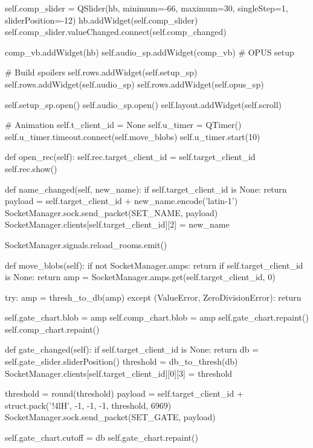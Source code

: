 \begin{pythoncode}
        self.comp_slider = QSlider(hb, minimum=-66, maximum=30, singleStep=1, sliderPosition=-12)
        hb.addWidget(self.comp_slider)
        self.comp_slider.valueChanged.connect(self.comp_changed)

        comp_vb.addWidget(hb)
        self.audio_sp.addWidget(comp_vb)
        # OPUS setup

        # Build spoilers
        self.rows.addWidget(self.setup_sp)
        self.rows.addWidget(self.audio_sp)
        self.rows.addWidget(self.opus_sp)

        self.setup_sp.open()
        self.audio_sp.open()
        self.layout.addWidget(self.scroll)

        # Animation
        self.t_client_id = None
        self.u_timer = QTimer()
        self.u_timer.timeout.connect(self.move_blobs)
        self.u_timer.start(10)

    def open_rec(self):
        self.rec.target_client_id = self.target_client_id
        self.rec.show()

    def name_changed(self, new_name):
        if self.target_client_id is None:
            return
        payload = self.target_client_id + new_name.encode('latin-1')
        SocketManager.sock.send_packet(SET_NAME, payload)
        SocketManager.clients[self.target_client_id][2] = new_name

        SocketManager.signals.reload_rooms.emit()

    def move_blobs(self):
        if not SocketManager.amps:
            return
        if self.target_client_id is None:
            return
        amp = SocketManager.amps.get(self.target_client_id, 0)

        try:
            amp = thresh_to_db(amp)
        except (ValueError, ZeroDivisionError):
            return

        self.gate_chart.blob = amp
        self.comp_chart.blob = amp
        self.gate_chart.repaint()
        self.comp_chart.repaint()

    def gate_changed(self):
        if self.target_client_id is None:
            return
        db = self.gate_slider.sliderPosition()
        threshold = db_to_thresh(db)
        SocketManager.clients[self.target_client_id][0][3] = threshold

        threshold = round(threshold)
        payload = self.target_client_id + struct.pack('!4lH', -1, -1, -1, threshold, 6969)
        SocketManager.sock.send_packet(SET_GATE, payload)

        self.gate_chart.cutoff = db
        self.gate_chart.repaint()


\end{pythoncode}

